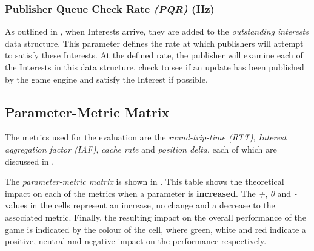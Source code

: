 \subsubsection*{Publisher Queue Check Rate \textit{(PQR)} (Hz)}
As outlined in , when Interests arrive, they are added to the \textit{outstanding interests} data structure. This parameter defines the rate at which publishers will attempt to satisfy these Interests. At the defined rate, the publisher will examine each of the Interests in this data structure, check to see if an update has been published by the game engine and satisfy the Interest if possible. 

\subsection{Parameter-Metric Matrix}
The metrics used for the evaluation are the \textit{round-trip-time (RTT)}, \textit{Interest aggregation factor (IAF)}, \textit{cache rate} and \textit{position delta}, each of which are discussed in .

The \textit{parameter-metric matrix} is shown in . This table shows the theoretical impact on each of the metrics when a parameter is \textbf{increased}. The \textit{+}, \textit{0} and \textit{-} values in the cells represent an increase, no change and a decrease to the associated metric. Finally, the resulting impact on the overall performance of the game is indicated by the colour of the cell, where green, white and red indicate a positive, neutral and negative impact on the performance respectively. 

